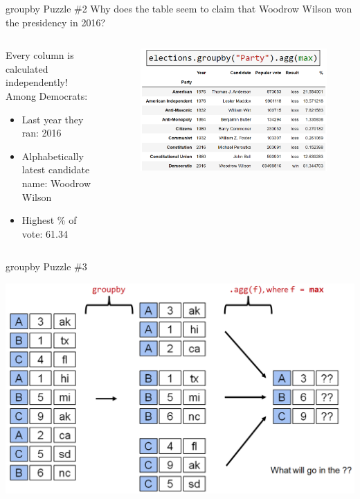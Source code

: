 \documentclass[aspectratio=169]{../latex_main/tntbeamer}  %
\begin{document}
    \begin{frame}{groupby Puzzle \#2}
    Why does the table seem to claim that Woodrow Wilson won the presidency in 2016?
    \begin{columns}
        
    \begin{column}{.4\textwidth}
            Every column is calculated independently! Among Democrats:
            \begin{itemize}
                \item Last year they ran: 2016
                \item Alphabetically latest candidate name: Woodrow Wilson
                \item Highest \% of vote: 61.34
            \end{itemize}
    \end{column}
    \begin{column}{.5\textwidth}
        \begin{figure}
             \includegraphics[scale=.28]{Bild26}
        \end{figure}
    \end{column}
       
        
    \end{columns}
    \end{frame}
    
    
    
     \begin{frame}{groupby Puzzle \#3}

        \centering
        \includegraphics[scale=.36]{Bild28}
    \end{frame}
    
\end{document}
